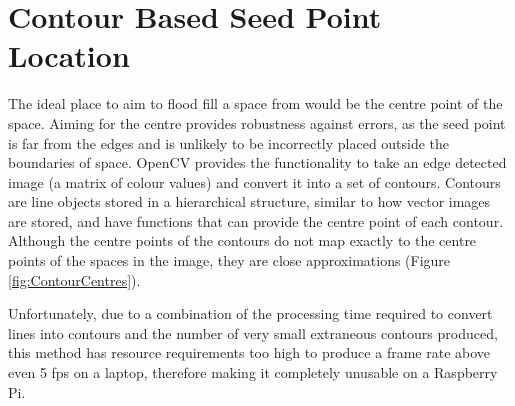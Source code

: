 \chapter{Contour Based Seed Point Location}
\label{appendix:contour}

The ideal place to aim to flood fill a space from would be the centre point of the space. Aiming for the centre provides robustness against errors, as the seed point is far from the edges and is unlikely to be incorrectly placed outside the boundaries of space. OpenCV provides the functionality to take an edge detected image (a matrix of colour values) and convert it into a set of contours. Contours are line objects stored in a hierarchical structure, similar to how vector images are stored, and have functions that can provide the centre point of each contour. Although the centre points of the contours do not map exactly to the centre points of the spaces in the image, they are close approximations (Figure \ref{fig:ContourCentres}).

Unfortunately, due to a combination of the processing time required to convert lines into contours and the number of very small extraneous contours produced, this method has resource requirements too high to produce a frame rate above even 5 fps on a laptop, therefore making it completely unusable on a Raspberry Pi.

